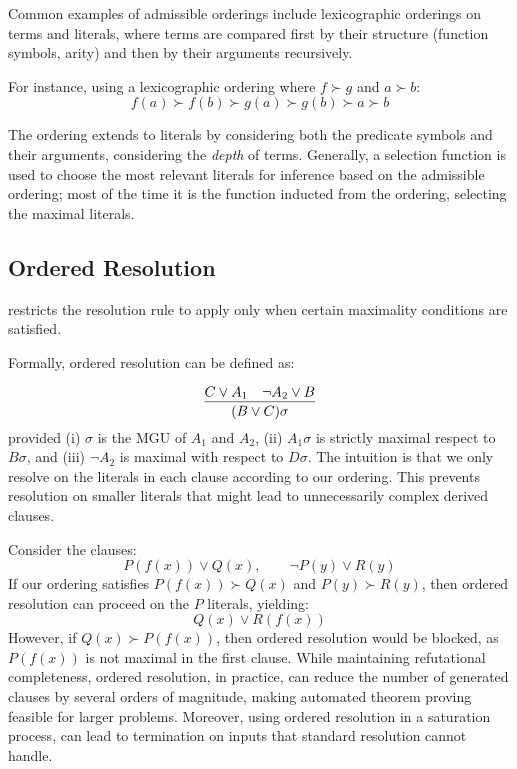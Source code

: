 Common examples of admissible orderings include lexicographic orderings on terms and literals, where terms are compared first by their structure (function symbols, arity) and then by their arguments recursively.

For instance, using a lexicographic ordering where \(f \succ g\) and \(a \succ b\):
\[f(a) \succ f(b) \succ g(a) \succ g(b) \succ a \succ b\]

The ordering extends to literals by considering both the predicate symbols and their arguments, considering the \emph{depth} of terms.
Generally, a selection function is used to choose the most relevant literals for inference based on the admissible ordering; most of the time it is the function inducted from the ordering, selecting the maximal literals.

\subsection{Ordered Resolution}\label{subsec:ordered-resolution}

 restricts the resolution rule to apply only when certain maximality conditions are satisfied.

Formally, ordered resolution can be defined as:

\begin{equation}
  \infer{(B\lor C)\sigma}{C\lor A_1 & \neg A_2 \lor B}
\end{equation}
\indent provided (i) \(\sigma\) is the MGU of \(A_1\) and \(A_2\), (ii) \(A_1\sigma\) is strictly maximal respect to \(B\sigma\), and (iii) \(\neg A_2\) is maximal with respect to \(D\sigma\).
The intuition is that we only resolve on the  literals in each clause according to our ordering. This prevents resolution on smaller literals that might lead to unnecessarily complex derived clauses.

Consider the clauses:
\[P(f(x)) \lor Q(x), \qquad \neg P(y) \lor R(y)\]
If our ordering satisfies \(P(f(x)) \succ Q(x)\) and \(P(y) \succ R(y)\), then ordered resolution can proceed on the \(P\) literals, yielding:
\[Q(x) \lor R(f(x))\]
However, if \(Q(x) \succ P(f(x))\), then ordered resolution would be blocked, as \(P(f(x))\) is not maximal in the first clause.
While maintaining refutational completeness, ordered resolution, in practice, can reduce the number of generated clauses by several orders of magnitude, making automated theorem proving feasible for larger problems.
Moreover, using ordered resolution in a saturation process, can lead to termination on inputs that standard resolution cannot handle.

